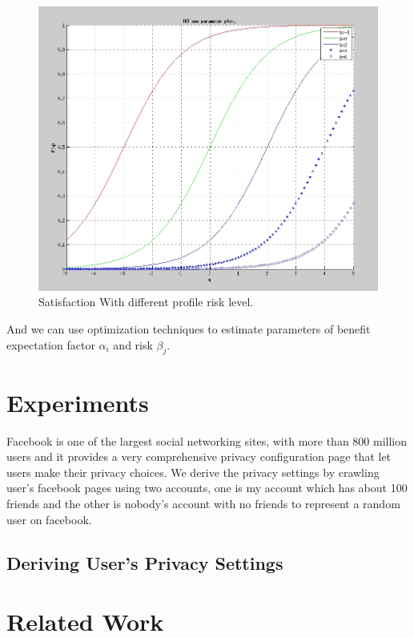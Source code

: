 \documentclass[a4paper]{article}
\begin{document}
\begin{figure}[H]
  \centering
  \includegraphics[width=.7\textwidth]{IRT-b.jpg}
  \caption{Satisfaction With different profile risk level.}
  \label{fig:irtb}
\end{figure}

And we can use optimization techniques to estimate parameters of
benefit expectation factor $\alpha_i$ and risk $\beta_j$.

\section{Experiments}
Facebook is one of the largest social networking sites, with more than
800 million users\cite{facebookwiki} and it provides a very
comprehensive privacy configuration page that let users make their
privacy choices. We derive the privacy settings by crawling user's
facebook pages using two accounts, one is my account which has about 100
friends and the other is nobody's account with no friends to represent
a random user on facebook.

\subsection{Deriving User's Privacy Settings}

\section{Related Work}
\end{document}
